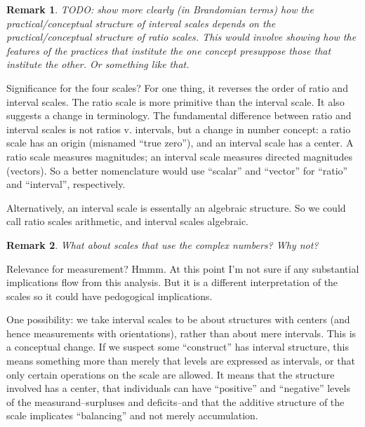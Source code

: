 \documentclass[11pt,twoside]{article}
\newtheorem{remark}{Remark}
\begin{document}
\begin{remark}
TODO: show more clearly (in Brandomian terms) how the
practical/conceptual structure of interval scales depends on the
practical/conceptual structure of ratio scales.  This would involve
showing how the features of the practices that institute the one
concept presuppose those that institute the other.  Or something like
that.
\end{remark}

Significance for the four scales?  For one thing, it reverses the
order of ratio and interval scales.  The ratio scale is more primitive
than the interval scale.  It also suggests a change in terminology.
The fundamental difference between ratio and interval scales is not
ratios v. intervals, but a change in number concept: a ratio scale has
an origin (misnamed ``true zero''), and an interval scale has a
center.  A ratio scale measures magnitudes; an interval scale measures
directed magnitudes (vectors).  So a better nomenclature would use
``scalar'' and ``vector'' for ``ratio'' and ``interval'',
respectively.

Alternatively, an interval scale is essentally an algebraic structure.
So we could call ratio scales arithmetic, and interval scales
algebraic.

\begin{remark}
  What about scales that use the complex numbers?  Why not?
\end{remark}

Relevance for measurement?  Hmmm.  At this point I'm not sure if any
substantial implications flow from this analysis.  But it is a
different interpretation of the scales so it could have pedogogical
implications.

One possibility: we take interval scales to be about structures with
centers (and hence measurements with orientations), rather than about
mere intervals.  This is a conceptual change.  If we suspect some
``construct'' has interval structure, this means something more than
merely that levels are expressed as intervals, or that only certain
operations on the scale are allowed.  It means that the structure
involved has a center, that individuals can have ``positive'' and
``negative'' levels of the measurand--surpluses and deficits--and that
the additive structure of the scale implicates ``balancing'' and not
merely accumulation.
\end{document}
